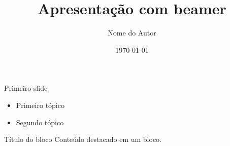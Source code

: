 \documentclass[aspectratio=169]{beamer}   %
\title{Apresentação com beamer}
\author{Nome do Autor}
\institute{Nome da Instituição}
\date{\today}
\begin{document}
\begin{frame}
  \titlepage
\end{frame}

\begin{frame}{Primeiro slide}   %
  \begin{itemize}
    \item Primeiro tópico
    \item Segundo tópico
  \end{itemize}

  \begin{block}{Título do bloco}
    Conteúdo destacado em um bloco.
  \end{block}
\end{frame}
\end{document}
